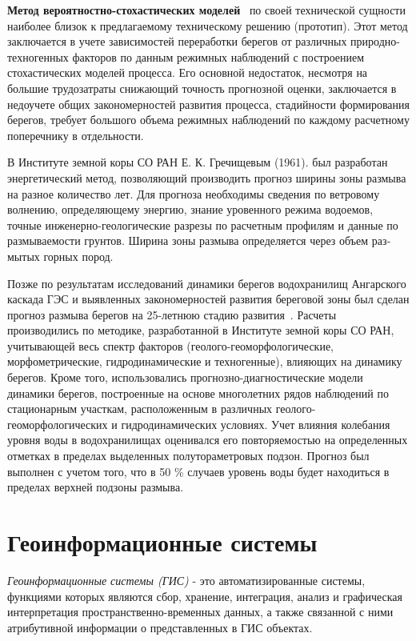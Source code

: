 \documentclass[732,fontsize=14pt,final]{studrep}
\begin{document}
\textbf{Метод вероятностно-стохастических моделей}~\cite{b20} по своей технической сущности наиболее близок к предлагаемому техническому решению (прототип). Этот метод заключается в учете зависимостей переработки берегов от различных природно-техногенных факторов по данным режимных наблюдений с построением стохастических моделей процесса. Его основной недостаток, несмотря на большие трудозатраты снижающий точность прогнозной оценки, заключается в недоучете общих закономерностей развития процесса, стадийности формирования берегов, требует большого объема режимных наблюдений по каждому расчетному поперечнику в отдельности.

В Институте земной коры СО РАН Е. К. Гречищевым (1961). был разработан энергетический метод, позволяющий производить прогноз ширины зоны размыва на разное количество лет. Для прогноза необходимы сведения по ветровому волнению, определяющему энергию, знание уровенного режима водоемов, точные инженерно-геологические разрезы по расчетным профи­лям и данные по размываемости грунтов. Ширина зоны размыва определяется через объем раз­мытых горных пород.

Позже по результатам исследований динамики берегов водохранилищ Ангарского каскада ГЭС и выявленных закономерностей развития береговой зоны был сделан прогноз размыва берегов на 25-летнюю стадию развития~\cite{ovch99}. Расчеты производились по методике, разработанной в Институте земной коры СО РАН, учитывающей весь спектр факторов (геолого-геоморфологические, морфометрические, гидродинамические и техногенные), влияющих на динамику берегов. Кроме того, использовались прогнозно-диагностические модели динамики берегов, построенные на основе многолетних рядов наблюдений по стационарным участкам, расположенным в различных геолого-геоморфологических и гидродинамических условиях. Учет влияния колебания уровня воды в водохранилищах оценивался его повторяемостью на определенных отметках в пределах выделенных полутораметровых подзон. Прогноз был выполнен с учетом того, что в 50 \% случаев уровень воды будет находиться в пределах верхней подзоны размыва.

\section{Геоинформационные системы}


\emph{Геоинформационные системы (ГИС)} - это автоматизированные системы, функциями которых являются сбор, хранение, интеграция, анализ и графическая интерпретация пространственно-временных данных, а также связанной с ними атрибутивной информации о представленных в ГИС объектах.
\end{document}
